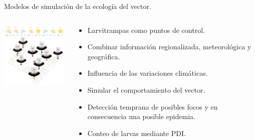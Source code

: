
\begin{frame}[t]{Modelos de simulación de la ecología del vector.}
  \begin{center}
   \begin{columns}[T]
        \begin{column}[T]{4cm}
             \includegraphics[width=4.5cm]{./graphics/larvitrmpas-clima.png}
        \end{column}
        \begin{column}[T]{7cm}
          \begin{itemize}
          \item Larvitrampas como puntos de control.
          \item Combinar información regionalizada, meteorológica y geográfica.
          \item Influencia de las variaciones climáticas.
          \item Simular el comportamiento del vector.
          \item Detección temprana de posibles focos y en consecuencia una posible epidemia.
          \item Conteo de larvas mediante PDI.
          \end{itemize}
        \end{column}
    \end{columns}
  \end{center}
\end{frame}

